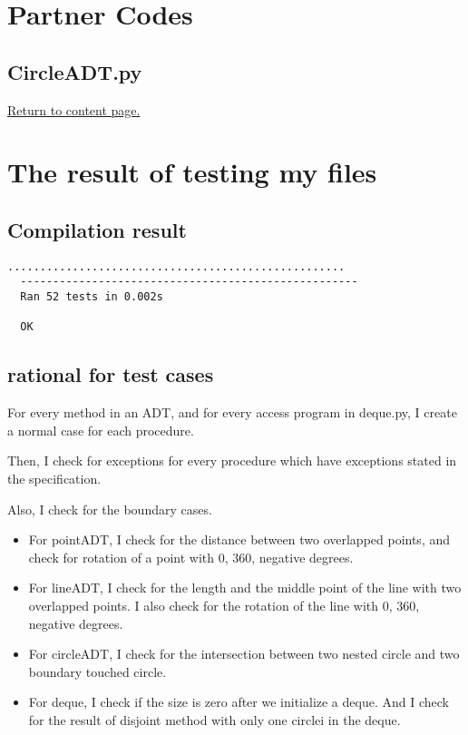 \documentclass[12pt]{article}
\begin{document}
\section{Partner Codes}

  \subsection{CircleADT.py}
  


\vskip 5cm
\hyperlink{toc}{Return to content page.}

\section{The result of testing my files}

  \subsection {Compilation result}
  \begin{lstlisting}[frame=single]
  ....................................................
  ----------------------------------------------------
  Ran 52 tests in 0.002s

  OK
  \end{lstlisting}

  \subsection {rational for test cases}
  For every method in an ADT, and for every access program
  in deque.py, I create a normal case for each procedure.

  
  Then, I check for exceptions for every procedure which have
  exceptions stated in the specification.


  Also, I check for the boundary cases.
  \begin{itemize}
    \item For pointADT, I check for the distance between two 
  overlapped points, and check for rotation of a point with 
  0, 360, negative degrees.
    \item For lineADT, I check for the length and the middle 
  point of the line with two overlapped points. I also check 
  for the rotation of the line with 0, 360, negative degrees.
    \item For circleADT, I check for the intersection between
  two nested circle and two boundary touched circle.
    \item For deque, I check if the size is zero after we 
  initialize a deque. And I check for the result of disjoint
  method with only one circlei in the deque.
  \end{itemize}
\end{document}
